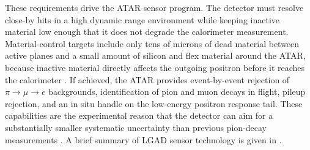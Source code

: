 These requirements drive the ATAR sensor program. The detector must resolve
close-by hits in a high dynamic range environment while keeping inactive
material low enough that it does not degrade the calorimeter measurement.
Material-control targets include only tens of microns of dead material between
active planes and a small amount of silicon and flex material around the ATAR,
because inactive material directly affects the outgoing positron before it
reaches the calorimeter \cite{atar_kpp_2025}. If achieved, the ATAR provides
event-by-event rejection of
\(\pi\to\mu\to e\) backgrounds, identification of pion and muon decays in
flight, pileup rejection, and an in situ handle on the low-energy positron
response tail. These capabilities are the experimental
reason that the detector can aim for a substantially smaller systematic
uncertainty than previous pion-decay measurements
\cite{pioneer_proposal_2022,mazza_high_granularity_atar_2023}. A brief
summary of LGAD sensor technology is given in
.
\FloatBarrier
